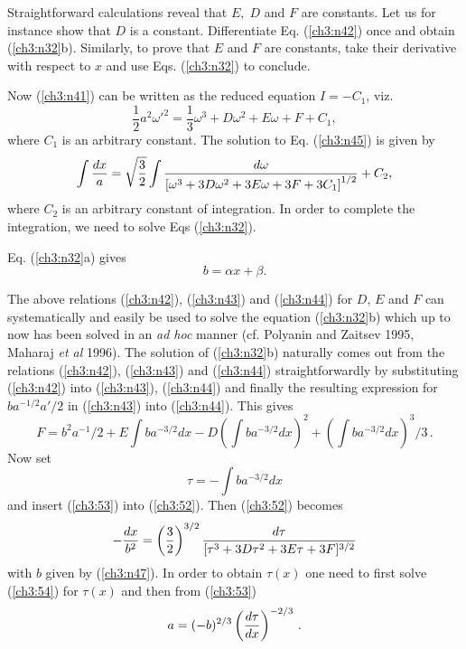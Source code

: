 Straightforward calculations reveal that
$E,\; D$ and $F$ are constants. Let us for instance show that $D$ is a
constant. Differentiate Eq. (\ref{ch3:n42}) once and obtain (\ref{ch3:n32}b). Similarly,
to prove that $E$ and $F$ are constants, take their derivative with respect
to $x$ and use Eqs. (\ref{ch3:n32}) to conclude. 


Now (\ref{ch3:n41}) can be written as the reduced
equation $I=-C_1$, viz.
\begin{equation}
\frac{1}{2}a^2\omega'^2=\frac{1}{3}\omega^3+D\omega^2+E\omega+F+C_1,
\label{ch3:n45} \end{equation} where $C_1$ is an arbitrary constant. The
solution to Eq. (\ref{ch3:n45}) is given by 
\begin{equation}
\int {dx\over a}=\sqrt{3\over2} \int  \frac{d\omega}{\left [ \omega^3
+3D\omega^2 +3E\omega+3F+3C_1\right]^{1/2}}+C_2 ,\label{ch3:n46}
\end{equation} 
where $C_2$ is an arbitrary constant of integration. In
order to complete the integration, we need to solve Eqs
(\ref{ch3:n32}). 

Eq. (\ref{ch3:n32}a) gives 
\begin{equation} 
b=\alpha
x+\beta . \label{ch3:n47} 
\end{equation} 

The above relations (\ref{ch3:n42}), (\ref{ch3:n43}) and (\ref{ch3:n44}) for $D$, $E$
and $F$ can systematically and easily be used to solve the equation (\ref{ch3:n32}b) which 
up to now has been solved in an {\em ad hoc} manner
(cf. Polyanin and Zaitsev 1995, Maharaj {\em et al} 1996). The solution of (\ref{ch3:n32}b)
naturally comes out from the relations (\ref{ch3:n42}), (\ref{ch3:n43}) and (\ref{ch3:n44}) straightforwardly by
substituting (\ref{ch3:n42}) into (\ref{ch3:n43}), (\ref{ch3:n44}) and finally the resulting expression for 
$ba^{-1/2}a'/2$ in (\ref{ch3:n43}) into (\ref{ch3:n44}). This gives 
\begin{equation}
F=b^2a^{-1}/2+E\int ba^{-3/2}dx-D(\int ba^{-3/2}dx)^2+(\int ba^{-3/2}dx)^3/3\,.\label{ch3:52}
\end{equation}
Now set 
\begin{equation}
\tau=-\int ba^{-3/2}dx \label{ch3:53}
\end{equation}  
and insert (\ref{ch3:53}) into (\ref{ch3:52}). Then (\ref{ch3:52}) becomes 
\begin{equation}
-{dx\over b^2}=\left(\frac32\right)^{3/2} {d\tau\over [\tau^3 +3D\tau^2+3E\tau+3F]^{3/2}}\label{ch3:54}
\end{equation} 
with $b$ given by (\ref{ch3:n47}). In order to obtain $\tau(x)$ one need to first solve (\ref{ch3:54})
for $\tau(x)$ and then from (\ref{ch3:53}) 
\begin{equation}
a=(-b)^{2/3}\left({d\tau\over dx}\right)^{-2/3}\,.\label{ch3:55}
\end{equation}

